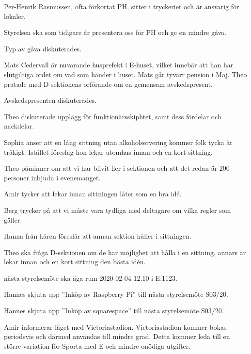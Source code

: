 \documentclass[10pt]{article}
\begin{document}
\begin{paragrafer}
Per-Henrik Rasmussen, ofta förkortat PH, sitter i tryckeriet och är ansvarig för lokaler.

Styrelsen ska som tidigare år presentera oss för PH och ge en mindre gåva.

Typ av gåva diskuterades.

Mats Cedervall är nuvarande husprefekt i E-huset, vilket innebär att han har slutgiltiga ordet om vad som händer i huset.
Mats går tyvärr pension i Maj.
Theo pratade med D-sektionens orförande om en gemensam avskedspresent.

Avskedspresenten diskuterades.


Theo diskuterade upplägg för funktionärsskiphtet, samt dess fördelar och nackdelar.

Sophia anser att en lång sittning utan alkoholservering kommer folk tycka är tråkigt. Istället föreslåg hon lekar utomhus innan och en kort sittning.

Theo påminner om att vi har blivit fler i sektionen och att det redan är 200 personer inbjudn i evenemanget.

Amir tycker att lekar innan sittningen låter som en bra idé.

Berg trycker på att vi måste vara tydliga med deltagare om vilka regler som gäller.

Hanna från kåren föreslår att annan sektion håller i sittningen.

Theo ska fråga D-sektionen om de har möjlighet att hålla i en sittning, annars är lekar innan och en kort sittning den bästa idén.


\Mba nästa styrelsemöte ska äga rum 2020-02-04 12.10 i E:1123.


Hannes \ypa skjuta upp ''Inköp av Raspberry Pi'' till nästa styrelsemöte S03/20.

\Mbaby 

Hannes \ypa skjuta upp ''Inköp av squarespace'' till nästa styrelsemöte S03/20.

\Mbaby 


Amir informerar läget med Victoriastadion. Victoriastadion kommer bokas periodsvis och därmed användas till mindre grad. Detta kommer leda till en större variation för Sporta med E och mindre onödiga utgifter.


\end{paragrafer}
\end{document}
